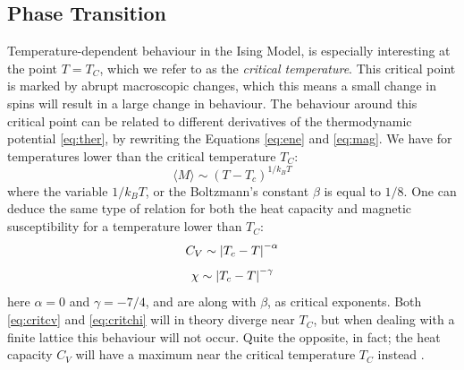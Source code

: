 \documentclass[10pt, nofootinbib, twocolumn]{revtex4-1}
\begin{document}
\subsection{Phase Transition}
Temperature-dependent behaviour in the Ising Model, is especially interesting at the point $T=T_C$, which we refer to as the \textit{critical temperature}. This critical point is marked by abrupt macroscopic changes, which this means a small change in spins will result in a large change in behaviour. The behaviour around this critical point can be related  to different derivatives of the thermodynamic potential \eqref{eq:ther}, by rewriting the Equations \eqref{eq:ene} and \eqref{eq:mag}. We have for temperatures lower than the critical temperature $T_C$: 
\begin{equation}
    \langle M \rangle \sim \left(T-T_c\right)^{1/k_BT} \label{eq:critm}
\end{equation}
where the variable $1/k_BT$, or the Boltzmann's constant $\beta$ is equal to $1/8$. One can deduce the same type of relation for both the heat capacity and magnetic susceptibility for a temperature lower than $T_C$: 
\begin{equation}
    C_V \sim \abs{T_c-T}^{-\alpha} \label{eq:critcv}
\end{equation}
\begin{equation}
    \chi \sim \abs{T_c-T}^{-\gamma} \label{eq:critchi}
\end{equation}
here $\alpha = 0$ and $\gamma=-7/4$, and are along with $\beta$, as critical exponents. Both \eqref{eq:critcv} and \eqref{eq:critchi} will in theory diverge near $T_C$, but when dealing with a finite lattice this behaviour will not occur. Quite the opposite, in fact; the heat capacity $C_V$ will have a maximum near the critical temperature $T_C$ instead \cite[p.~431]{notes}. \\
\end{document}
